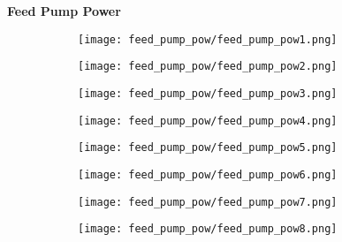 \documentclass{article}
\begin{document}
    \textbf{Feed Pump Power}
    \begin{figure}[H]
        \centering
        \begin{subfigure}{0.48\linewidth}
		    \texttt{[image: feed\_pump\_pow/feed\_pump\_pow1.png]}
	    \end{subfigure}
	    \begin{subfigure}{0.48\linewidth}
		    \texttt{[image: feed\_pump\_pow/feed\_pump\_pow2.png]}
	    \end{subfigure}
	    \begin{subfigure}{0.48\linewidth}
		    \texttt{[image: feed\_pump\_pow/feed\_pump\_pow3.png]}
	    \end{subfigure}
	    \begin{subfigure}{0.48\linewidth}
		    \texttt{[image: feed\_pump\_pow/feed\_pump\_pow4.png]}
	    \end{subfigure}
	    \begin{subfigure}{0.48\linewidth}
		    \texttt{[image: feed\_pump\_pow/feed\_pump\_pow5.png]}
	    \end{subfigure}
	    \begin{subfigure}{0.48\linewidth}
		    \texttt{[image: feed\_pump\_pow/feed\_pump\_pow6.png]}
	    \end{subfigure}
	    \begin{subfigure}{0.48\linewidth}
		    \texttt{[image: feed\_pump\_pow/feed\_pump\_pow7.png]}
	    \end{subfigure}
	    \begin{subfigure}{0.48\linewidth}
		    \texttt{[image: feed\_pump\_pow/feed\_pump\_pow8.png]}
	    \end{subfigure}
    \end{figure}
    
    \pagebreak
    
\end{document}
